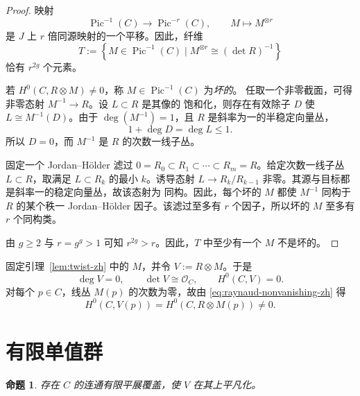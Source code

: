 \documentclass[UTF8,10pt,a4paper]{ctexart}
\newtheorem{proposition}[theorem]{命题}
\theoremstyle{remark}
\newcommand{\OO}{\mathcal{O}}
\newcommand{\tens}{\otimes}
\DeclareMathOperator{\Pic}{Pic}
\begin{document}
\begin{proof}
映射
\[
  \Pic^{-1}(C)\longrightarrow\Pic^{-r}(C),
  \qquad
  M\longmapsto M^{\tens r}
\]
是 $J$ 上 $r$ 倍同源映射的一个平移。因此，纤维
\[
  T:=\left\{M\in\Pic^{-1}(C)\mid
  M^{\tens r}\cong(\det R)^{-1}\right\}
\]
恰有 $r^{2g}$ 个元素。

若 $H^0(C,R\tens M)\neq0$，称 $M\in\Pic^{-1}(C)$ 为\emph{坏的}。
任取一个非零截面，可得非零态射 $M^{-1}\to R$。设 $L\subset R$ 是其像的
饱和化，则存在有效除子 $D$ 使 $L\cong M^{-1}(D)$。由于
$\deg(M^{-1})=1$，且 $R$ 是斜率为一的半稳定向量丛，
\[
  1+\deg D=\deg L\leq1.
\]
所以 $D=0$，而 $M^{-1}$ 是 $R$ 的次数一线子丛。

固定一个 Jordan--H\"older 滤过
$0=R_0\subset R_1\subset\cdots\subset R_m=R$。给定次数一线子丛
$L\subset R$，取满足 $L\subset R_k$ 的最小 $k$。诱导态射
$L\to R_k/R_{k-1}$ 非零。其源与目标都是斜率一的稳定向量丛，故该态射为
同构。因此，每个坏的 $M$ 都使 $M^{-1}$ 同构于 $R$ 的某个秩一
Jordan--H\"older 因子。该滤过至多有 $r$ 个因子，所以坏的 $M$ 至多有 $r$
个同构类。

由 $g\geq2$ 与 $r=g^g>1$ 可知 $r^{2g}>r$。因此，$T$ 中至少有一个
$M$ 不是坏的。
\end{proof}

固定引理~\ref{lem:twist-zh} 中的 $M$，并令 $V:=R\tens M$。于是
\begin{equation}\label{eq:V-properties-zh}
  \deg V=0,
  \qquad
  \det V\cong\OO_C,
  \qquad
  H^0(C,V)=0.
\end{equation}
对每个 $p\in C$，线丛 $M(p)$ 的次数为零，故由
\eqref{eq:raynaud-nonvanishing-zh} 得
\begin{equation}\label{eq:V-pointwise-zh}
  H^0(C,V(p))=H^0(C,R\tens M(p))\neq0.
\end{equation}

\section{有限单值群}

\begin{proposition}\label{prop:finite-monodromy-zh}
存在 $C$ 的连通有限平展覆盖，使 $V$ 在其上平凡化。
\end{proposition}
\end{document}
